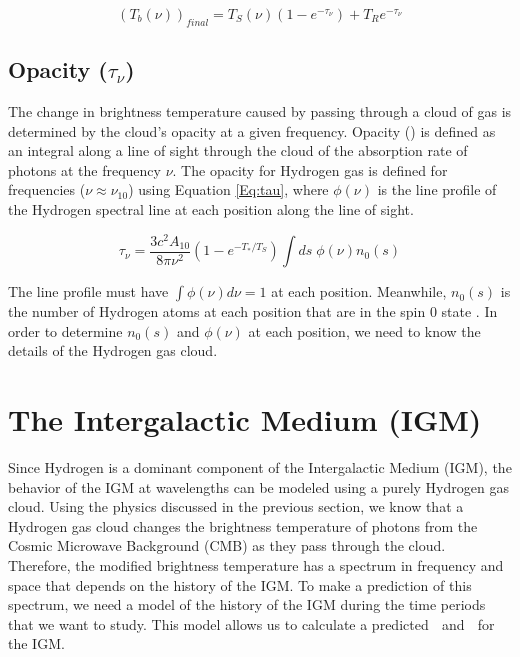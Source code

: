 \begin{equation}\label{Eq:T_bf}
(T_b (\nu))_{final}= T_{S} (\nu) (1-e^{-\tau_\nu}) +T_{R} e^{-\tau_\nu}
\end{equation}



\subsection{Opacity ($\tau_\nu$)}

The change in brightness temperature caused by passing through a cloud of gas is determined by the cloud's opacity at a given frequency. Opacity (\tu) is defined as an integral along a line of sight through the cloud of the absorption rate of photons at the frequency $\nu$. The opacity for Hydrogen gas is defined for frequencies ($\nu \approx \nu_{10}$) using Equation \ref{Eq:tau}, where $\phi (\nu)$ is the line profile of the Hydrogen \cm spectral line at each position along the line of sight.

\begin{equation} \label{Eq:tau}
\tau_{\nu} = \frac{3 c^2 A_{10}}{8 \pi \nu^2 } (1-e^{-T_*/T_S}) \int ds \; \phi (\nu) n_0(s)
\end{equation}

 The line profile must have $\int \phi(\nu) d \nu = 1$ at each position. Meanwhile, $n_0 (s)$ is the number of Hydrogen atoms at each position that are in the spin 0 state \cite{furlanetto_2006}. In order to determine $n_0 (s)$ and $\phi (\nu)$ at each position, we need to know the details of the Hydrogen gas cloud. 



\section{The Intergalactic Medium (IGM)}\label{Sec:IGM}

Since Hydrogen is a dominant component of the Intergalactic Medium (IGM), the behavior of the IGM at \cm wavelengths can be modeled using a purely Hydrogen gas cloud. Using the physics discussed in the previous section, we know that a Hydrogen gas cloud changes the brightness temperature of \cm photons from the Cosmic Microwave Background (CMB) as they pass through the cloud. Therefore, the modified brightness temperature has a spectrum in frequency and space that depends on the history of the IGM. To make a prediction of this spectrum, we need a model of the history of the IGM during the time periods that we want to study. This model allows us to calculate a predicted \ts $\;$ and \tu $\;$ for the IGM. 


